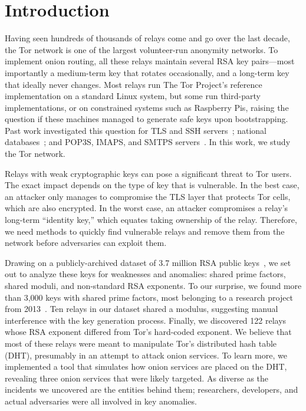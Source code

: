 \section{Introduction}
Having seen hundreds of thousands of relays come and go over the last decade,
the Tor network is one of the largest volunteer-run anonymity networks.  To
implement onion routing, all these relays maintain several RSA key pairs---most
importantly a medium-term key that rotates occasionally, and a long-term key
that ideally never changes.  Most relays run The Tor Project's reference
implementation on a standard Linux system, but some run third-party
implementations, or on constrained systems such as Raspberry Pis, raising the
question if these machines managed to generate safe keys upon bootstrapping.
Past work investigated this question for TLS and SSH
servers~\cite{Heninger2012a}; national  databases~\cite{Bernstein2013a}; and
POP3S, IMAPS, and SMTPS servers~\cite{Hastings2016a}.  In this work, we study
the Tor network.

Relays with weak cryptographic keys can pose a significant threat to Tor users.
The exact impact depends on the type of key that is vulnerable.  In the best
case, an attacker only manages to compromise the TLS layer that protects Tor
cells, which are also encrypted.  In the worst case, an attacker compromises a
relay's long-term ``identity key,'' which equates taking ownership of the relay.
Therefore, we need methods to quickly find vulnerable relays and remove them
from the network before adversaries can exploit them.

Drawing on a publicly-archived dataset of 3.7 million RSA public
keys~\cite{collector}, we set out to analyze these keys for weaknesses and
anomalies: shared prime factors, shared moduli, and non-standard RSA exponents.
To our surprise, we found more than 3,000 keys with shared prime factors, most
belonging to a research project from 2013~\cite{Biryukov2013a}.  Ten relays in
our dataset shared a modulus, suggesting manual interference with the key
generation process.  Finally, we discovered 122 relays whose RSA exponent
differed from Tor's hard-coded exponent.  We believe that most of these relays
were meant to manipulate Tor's distributed hash table (DHT), presumably in an
attempt to attack onion services.  To learn more, we implemented a tool that
simulates how onion services are placed on the DHT, revealing three onion
services that were likely targeted.  As diverse as the incidents we uncovered
are the entities behind them; researchers, developers, and actual adversaries
were all involved in key anomalies.

